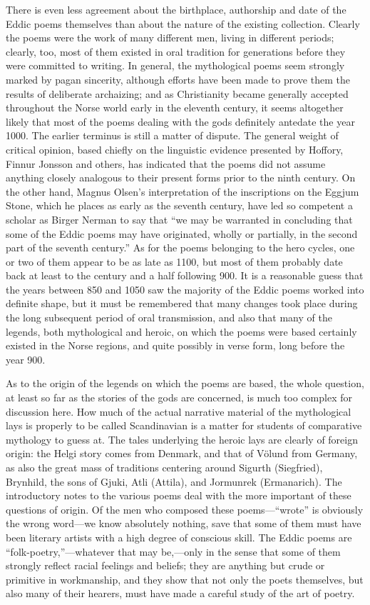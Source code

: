 \documentclass{scrbook}
\newcommand{\mdash}{---}
\newcommand{\commamdash}{---} %
\begin{document}
There is even less agreement about the birthplace, authorship and date of the Eddic poems themselves than about the nature of the existing collection. Clearly the poems were the work of many different men, living in different periods; clearly, too, most of them existed in oral tradition for generations before they were committed to writing. In general, the mythological poems seem strongly marked by pagan sincerity, although efforts have been made to prove them the results of deliberate archaizing; and as Christianity became generally accepted throughout the Norse world early in the eleventh century, it seems altogether likely that most of the poems dealing with the gods definitely antedate the year 1000. The earlier terminus is still a matter of dispute. The general weight of critical opinion, based chiefly on the linguistic evidence presented by Hoffory, Finnur Jonsson and others, has indicated that the poems did not assume anything closely analogous to their present forms prior to the ninth century. On the other hand, Magnus Olsen's interpretation of the inscriptions on the Eggjum Stone, which he places as early as the seventh century, have led so competent a scholar as Birger Nerman to say that ``we may be warranted in concluding that some of the Eddic poems may have originated, wholly or partially, in the second part of the seventh century.'' As for the poems belonging to the hero cycles, one or two of them appear to be as late as 1100, but most of them probably date back at least to the century and a half following 900. It is a reasonable guess that the years between 850 and 1050 saw the majority of the Eddic poems worked into definite shape, but it must be remembered that many changes took place during the long subsequent period of oral transmission, and also that many of the legends, both mythological and heroic, on which the poems were based certainly existed in the Norse regions, and quite possibly in verse form, long before the year 900.

As to the origin of the legends on which the poems are based, the whole question, at least so far as the stories of the gods are concerned, is much too complex for discussion here. How much of the actual narrative material of the mythological lays is properly to be called Scandinavian is a matter for students of comparative mythology to guess at. The tales underlying the heroic lays are clearly of foreign origin: the Helgi story comes from Denmark, and that of Völund from Germany, as also the great mass of traditions centering around Sigurth (Siegfried), Brynhild, the sons of Gjuki, Atli (Attila), and Jormunrek (Ermanarich). The introductory notes to the various poems deal with the more important of these questions of origin. Of the men who composed these poems{\commamdash}``wrote'' is obviously the wrong word{\mdash}we know absolutely nothing, save that some of them must have been literary artists with a high degree of conscious skill. The Eddic poems are ``folk-poetry,''{\mdash}whatever that may be,{\commamdash}only in the sense that some of them strongly reflect racial feelings and beliefs; they are anything but crude or primitive in workmanship, and they show that not only the poets themselves, but also many of their hearers, must have made a careful study of the art of poetry.
\end{document}

